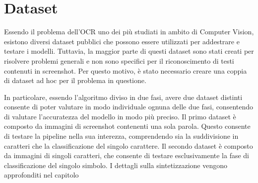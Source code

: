 \chapter{Dataset}

Essendo il problema dell'OCR uno dei più studiati in ambito di Computer Vision, esistono diversi dataset pubblici che possono essere utilizzati per addestrare e testare i modelli. Tuttavia, la maggior parte di questi dataset sono stati creati per risolvere problemi generali e non sono specifici per il riconoscimento di testi contenuti in screenshot. Per questo motivo, è stato necessario creare una coppia di dataset ad hoc per il problema in questione.

In particolare, essendo l'algoritmo diviso in due fasi, avere due dataset distinti consente di poter valutare in modo individuale ognuna delle due fasi, consentendo di valutare l'accuratezza del modello in modo più preciso.
Il primo dataset è composto da immagini di screenshot contenenti una sola parola. Questo consente di testare la pipeline nella sua interezza, comprendendo sia la suddivisione in caratteri che la classificazione del singolo carattere. Il secondo dataset è composto da immagini di singoli caratteri, che consente di testare esclusivamente la fase di classificazione del singolo simbolo. I dettagli sulla sintetizzazione vengono approfonditi nel capitolo %